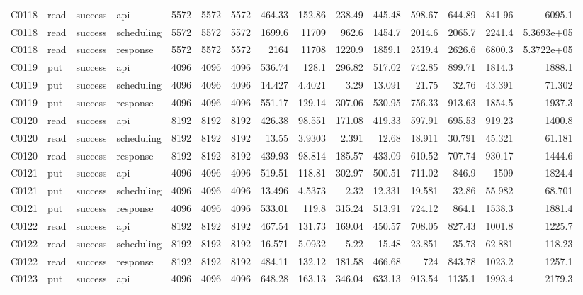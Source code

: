 \begin{landscape}
\begin{longtable}{llllrrrrrrrrrrr}
C0118 & read & success & api & 5572 & 5572 & 5572 & 464.33 & 152.86 & 238.49 & 445.48 & 598.67 & 644.89 & 841.96 & 6095.1\\
C0118 & read & success & scheduling & 5572 & 5572 & 5572 & 1699.6 & 11709 & 962.6 & 1454.7 & 2014.6 & 2065.7 & 2241.4 & 5.3693e+05\\
C0118 & read & success & response & 5572 & 5572 & 5572 & 2164 & 11708 & 1220.9 & 1859.1 & 2519.4 & 2626.6 & 6800.3 & 5.3722e+05\\
C0119 & put & success & api & 4096 & 4096 & 4096 & 536.74 & 128.1 & 296.82 & 517.02 & 742.85 & 899.71 & 1814.3 & 1888.1\\
C0119 & put & success & scheduling & 4096 & 4096 & 4096 & 14.427 & 4.4021 & 3.29 & 13.091 & 21.75 & 32.76 & 43.391 & 71.302\\
C0119 & put & success & response & 4096 & 4096 & 4096 & 551.17 & 129.14 & 307.06 & 530.95 & 756.33 & 913.63 & 1854.5 & 1937.3\\
C0120 & read & success & api & 8192 & 8192 & 8192 & 426.38 & 98.551 & 171.08 & 419.33 & 597.91 & 695.53 & 919.23 & 1400.8\\
C0120 & read & success & scheduling & 8192 & 8192 & 8192 & 13.55 & 3.9303 & 2.391 & 12.68 & 18.911 & 30.791 & 45.321 & 61.181\\
C0120 & read & success & response & 8192 & 8192 & 8192 & 439.93 & 98.814 & 185.57 & 433.09 & 610.52 & 707.74 & 930.17 & 1444.6\\
C0121 & put & success & api & 4096 & 4096 & 4096 & 519.51 & 118.81 & 302.97 & 500.51 & 711.02 & 846.9 & 1509 & 1824.4\\
C0121 & put & success & scheduling & 4096 & 4096 & 4096 & 13.496 & 4.5373 & 2.32 & 12.331 & 19.581 & 32.86 & 55.982 & 68.701\\
C0121 & put & success & response & 4096 & 4096 & 4096 & 533.01 & 119.8 & 315.24 & 513.91 & 724.12 & 864.1 & 1538.3 & 1881.4\\
C0122 & read & success & api & 8192 & 8192 & 8192 & 467.54 & 131.73 & 169.04 & 450.57 & 708.05 & 827.43 & 1001.8 & 1225.7\\
C0122 & read & success & scheduling & 8192 & 8192 & 8192 & 16.571 & 5.0932 & 5.22 & 15.48 & 23.851 & 35.73 & 62.881 & 118.23\\
C0122 & read & success & response & 8192 & 8192 & 8192 & 484.11 & 132.12 & 181.58 & 466.68 & 724 & 843.78 & 1023.2 & 1257.1\\
C0123 & put & success & api & 4096 & 4096 & 4096 & 648.28 & 163.13 & 346.04 & 633.13 & 913.54 & 1135.1 & 1993.4 & 2179.3\\

\end{longtable}
\end{landscape}
